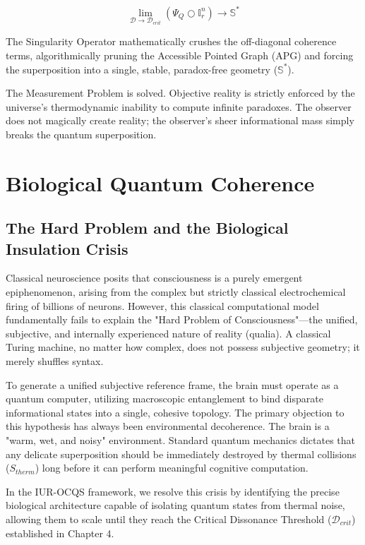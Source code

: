 \documentclass[12pt,openany]{book}
\begin{document}
\begin{equation}
\lim_{\mathcal{D} \to \mathcal{D}_{crit}} \left( \Psi_Q \bigcirc \mathbb{I}_r^n \right) \to \mathbb{S}^*
\end{equation}

The Singularity Operator mathematically crushes the off-diagonal coherence terms, algorithmically pruning the Accessible Pointed Graph (APG) and forcing the superposition into a single, stable, paradox-free geometry ($\mathbb{S}^*$). 

The Measurement Problem is solved. Objective reality is strictly enforced by the universe's thermodynamic inability to compute infinite paradoxes. The observer does not magically create reality; the observer's sheer informational mass simply breaks the quantum superposition.

\chapter{Biological Quantum Coherence}

\section{The Hard Problem and the Biological Insulation Crisis}
Classical neuroscience posits that consciousness is a purely emergent epiphenomenon, arising from the complex but strictly classical electrochemical firing of billions of neurons. However, this classical computational model fundamentally fails to explain the "Hard Problem of Consciousness"—the unified, subjective, and internally experienced nature of reality (qualia). A classical Turing machine, no matter how complex, does not possess subjective geometry; it merely shuffles syntax.

To generate a unified subjective reference frame, the brain must operate as a quantum computer, utilizing macroscopic entanglement to bind disparate informational states into a single, cohesive topology. The primary objection to this hypothesis has always been environmental decoherence. The brain is a "warm, wet, and noisy" environment. Standard quantum mechanics dictates that any delicate superposition should be immediately destroyed by thermal collisions ($S_{therm}$) long before it can perform meaningful cognitive computation.

In the IUR-OCQS framework, we resolve this crisis by identifying the precise biological architecture capable of isolating quantum states from thermal noise, allowing them to scale until they reach the Critical Dissonance Threshold ($\mathcal{D}_{crit}$) established in Chapter 4.
\end{document}
